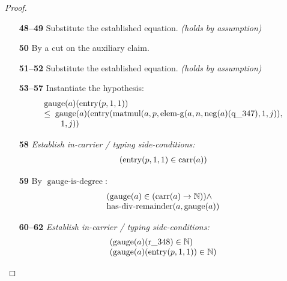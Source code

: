 \documentclass[11pt]{article}
\theoremstyle{plain}
\begin{document}
\begin{proof}
\begin{itemize}[leftmargin=2.8em, itemsep=4pt, parsep=1pt]
  \item[\textbf{48--49}] Substitute the established equation.  \emph{(holds by assumption)}
  \item[\textbf{50}] By a cut on the auxiliary claim.
  \item[\textbf{51--52}] Substitute the established equation.  \emph{(holds by assumption)}
  \item[\textbf{53--57}] Instantiate the hypothesis:
\begin{equation*}
\begin{array}{@{}l@{}} \operatorname{gauge}(a)(\operatorname{entry}(p, 1, 1)) \\ \leq\; \operatorname{gauge}(a)(\operatorname{entry}(\operatorname{matmul}(a, p, \operatorname{elem\text{-}g}(a, n, \operatorname{neg}(a)(\operatorname{q\_347}), 1, j)), \\ \quad \quad 1, j)) \end{array}
\end{equation*}

  \item[\textbf{58}] \emph{Establish in-carrier / typing side-conditions:}
\begin{equation*}
\begin{array}{@{}l@{}}
(\operatorname{entry}(p, 1, 1) \in \operatorname{carr}(a))
\end{array}
\end{equation*}

  \item[\textbf{59}] By $\operatorname{gauge\text{-}is\text{-}degree}$:
\begin{equation*}
\begin{array}{@{}l@{}} (\operatorname{gauge}(a) \in (\operatorname{carr}(a) \to \mathbb{N})) \wedge \\ \operatorname{has\text{-}div\text{-}remainder}(a, \operatorname{gauge}(a)) \end{array}
\end{equation*}

  \item[\textbf{60--62}] \emph{Establish in-carrier / typing side-conditions:}
\begin{equation*}
\begin{array}{@{}l@{}}
(\operatorname{gauge}(a)(\operatorname{r\_348}) \in \mathbb{N}) \\
(\operatorname{gauge}(a)(\operatorname{entry}(p, 1, 1)) \in \mathbb{N})
\end{array}
\end{equation*}


\end{itemize}
\end{proof}
\end{document}
